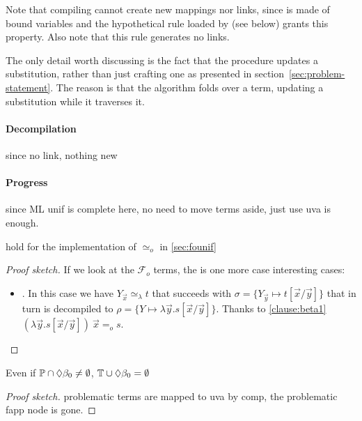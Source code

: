 \documentclass[sigconf,natbib=false,review]{acmart}
\newcommand{\EqualRel}{\ensuremath{=}}
\newcommand{\UnifRel}{\ensuremath{\simeq}}
\newcommand{\Uo}{\ensuremath{\UnifRel_o}\xspace}
\newcommand{\Eo}{\ensuremath{\EqualRel_o}\xspace}
\newcommand{\Ue}{\ensuremath{\UnifRel_\lambda}\xspace}
\newcommand{\Fo}{\ensuremath{\mathcal{F}_{\!o}\xspace}} %
\newcommand{\foUnifPb}{\ensuremath{\mathbb{P}}\xspace}
\newcommand{\hoUnifPb}{\ensuremath{\mathbb{T}}\xspace}
\begin{document}


\noindent
Note that compiling  cannot create new mappings nor links, since 
is made of bound variables and the hypothetical rule loaded by 
(see below) grants this property. Also note that this rule generates no links.


\noindent
The only detail worth discussing is the fact that the procedure updates a
substitution, rather than just crafting one as presented in
section~\ref{sec:problem-statement}. The reason is that the algorithm folds
over a term, updating a substitution while it traverses it.

\paragraph{Decompilation} since no link, nothing new

\paragraph{Progress} since ML unif is complete here, no
need to move terms aside, just use uva is enough. 

\begin{lemma}
   hold for the implementation of \Uo
  in \cref{sec:founif}
  \end{lemma}
  \begin{proof}[Proof sketch]
  If we look at the \Fo{} terms, the is one more case interesting cases:
  \begin{itemize}
  \item \elpiIn{fapp[fuva X|L] ~\Uo~s}. In this case
   we have $Y_{\vec{x}} \Ue t$ that succeeds with
   $\sigma = \{ Y_{\vec{y}} \mapsto t[\vec{x}/\vec{y}]\}$ that in turn
   is decompiled to $\rho = \{ Y \mapsto \lambda \vec{y}.s[\vec{x}/\vec{y}]\}$.
   Thanks to \ref{clause:beta1}
   $(\lambda \vec{y}.s[\vec{x}/\vec{y}])~\vec{x} \Eo s$.
  \end{itemize}
  \end{proof}
  
\begin{lemma}\label{lem:w-enforcement-maybebeta} Even if $\foUnifPb \cap \maybebeta \ne \emptyset$,
  $\hoUnifPb \cup \maybebeta = \emptyset$
\end{lemma}
\begin{proof}[Proof sketch]
  problematic terms are mapped to uva by comp, the problematic fapp node is gone.
\end{proof}
\end{document}

